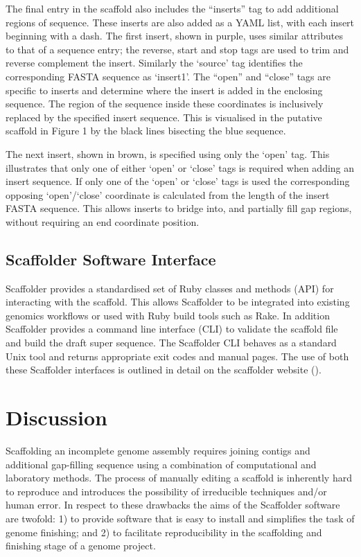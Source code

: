 \documentclass[10pt]{bmc_article}
\newenvironment{bmcformat}{\begin{raggedright}\baselineskip20pt\sloppy\setboolean{publ}{false}}{\end{raggedright}\baselineskip20pt\sloppy}
\begin{document}
\begin{bmcformat}
The final entry in the scaffold also includes the ``inserts'' tag to add
additional regions of sequence. These inserts are also added as a YAML list,
with each insert beginning with a dash. The first insert, shown in purple,
uses similar attributes to that of a sequence entry; the reverse, start and
stop tags are used to trim and reverse complement the insert. Similarly the
`source' tag identifies the corresponding FASTA sequence as `insert1'. The
``open'' and ``close'' tags are specific to inserts and determine where the
insert is added in the enclosing sequence. The region of the sequence inside
these coordinates is inclusively replaced by the specified insert sequence.
This is visualised in the putative scaffold in Figure 1 by the black lines
bisecting the blue sequence. \pb

The next insert, shown in brown, is specified using only the `open' tag. This
illustrates that only one of either `open' or `close' tags is required when
adding an insert sequence. If only one of the `open' or `close' tags is used
the corresponding opposing `open'/`close' coordinate is calculated from the
length of the insert FASTA sequence. This allows inserts to bridge into, and
partially fill gap regions, without requiring an end coordinate position. \pb

\subsection*{Scaffolder Software Interface} %

Scaffolder provides a standardised set of Ruby classes and methods (API) for
interacting with the scaffold. This allows Scaffolder to be integrated into
existing genomics workflows or used with Ruby build tools such as Rake. In
addition Scaffolder provides a command line interface (CLI) to validate the
scaffold file and build the draft super sequence. The Scaffolder CLI behaves
as a standard Unix tool and returns appropriate exit codes and manual pages.
The use of both these Scaffolder interfaces is outlined in detail on the
scaffolder website (\scaffolder). \pb

\clearpage

\section*{Discussion} %

Scaffolding an incomplete genome assembly requires joining contigs and
additional gap-filling sequence using a combination of computational and
laboratory methods. The process of manually editing a scaffold is inherently
hard to reproduce and introduces the possibility of irreducible techniques
and/or human error. In respect to these drawbacks the aims of the Scaffolder
software are twofold: 1) to provide software that is easy to install and
simplifies the task of genome finishing; and 2) to facilitate reproducibility
in the scaffolding and finishing stage of a genome project. \pb


\end{bmcformat}
\end{document}
